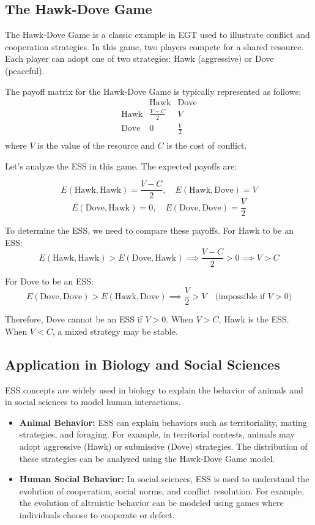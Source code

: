 \documentclass[12pt]{book} %
\begin{document}
\subsection{The Hawk-Dove Game}
The Hawk-Dove Game is a classic example in EGT used to illustrate conflict and cooperation strategies. In this game, two players compete for a shared resource. Each player can adopt one of two strategies: Hawk (aggressive) or Dove (peaceful).

The payoff matrix for the Hawk-Dove Game is typically represented as follows:
\[
\begin{array}{c|cc}
 & \text{Hawk} & \text{Dove} \\
\hline
\text{Hawk} & \frac{V - C}{2} & V \\
\text{Dove} & 0 & \frac{V}{2} \\
\end{array}
\]
where \( V \) is the value of the resource and \( C \) is the cost of conflict.

Let's analyze the ESS in this game. The expected payoffs are:

\[
E(\text{Hawk}, \text{Hawk}) = \frac{V - C}{2}, \quad E(\text{Hawk}, \text{Dove}) = V
\]
\[
E(\text{Dove}, \text{Hawk}) = 0, \quad E(\text{Dove}, \text{Dove}) = \frac{V}{2}
\]

To determine the ESS, we need to compare these payoffs. For Hawk to be an ESS:
\[
E(\text{Hawk}, \text{Hawk}) > E(\text{Dove}, \text{Hawk}) \implies \frac{V - C}{2} > 0 \implies V > C
\]

For Dove to be an ESS:
\[
E(\text{Dove}, \text{Dove}) > E(\text{Hawk}, \text{Dove}) \implies \frac{V}{2} > V \quad \text{(impossible if } V > 0\text{)}
\]

Therefore, Dove cannot be an ESS if \( V > 0 \). When \( V > C \), Hawk is the ESS. When \( V < C \), a mixed strategy may be stable.

\subsection{Application in Biology and Social Sciences}
ESS concepts are widely used in biology to explain the behavior of animals and in social sciences to model human interactions. 

\begin{itemize}
    \item \textbf{Animal Behavior:}
    ESS can explain behaviors such as territoriality, mating strategies, and foraging. For example, in territorial contests, animals may adopt aggressive (Hawk) or submissive (Dove) strategies. The distribution of these strategies can be analyzed using the Hawk-Dove Game model.

    \item \textbf{Human Social Behavior:}
    In social sciences, ESS is used to understand the evolution of cooperation, social norms, and conflict resolution. For example, the evolution of altruistic behavior can be modeled using games where individuals choose to cooperate or defect.
\end{itemize}
\end{document}
